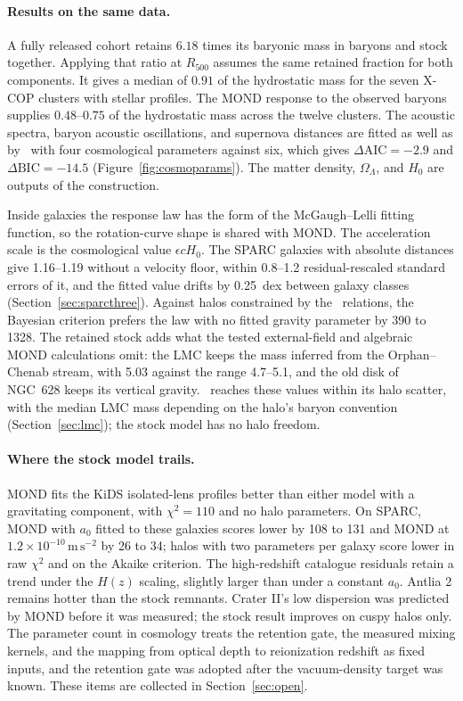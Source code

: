 \paragraph{Results on the same data.}
A fully released cohort retains $6.18$ times its baryonic mass in baryons
and stock together. Applying that ratio at $R_{500}$ assumes the same
retained fraction for both components. It gives a median of $0.91$ of
the hydrostatic mass for the seven X-COP clusters with stellar profiles.
The MOND response to the observed baryons supplies $0.48$--$0.75$ of
the hydrostatic mass across the twelve clusters. The acoustic spectra, baryon acoustic oscillations, and supernova distances are fitted as well
as by \LCDM\ with four cosmological parameters against six, which gives
$\Delta\mathrm{AIC}=-2.9$ and $\Delta\mathrm{BIC}=-14.5$
(Figure~\ref{fig:cosmoparams}). The matter
density, $\Omega_\Lambda$, and $H_0$ are outputs of the construction.

Inside galaxies the response law has the form of the McGaugh--Lelli
fitting function, so the rotation-curve shape is shared with MOND. The
acceleration scale is the cosmological value $\epsilon cH_0$. The SPARC
galaxies with absolute distances give 1.16--1.19 without a velocity floor,
within 0.8--1.2 residual-rescaled standard errors of it, and the fitted
value drifts by 0.25~dex
between galaxy classes (Section~\ref{sec:sparcthree}).
Against halos constrained by the \LCDM\ relations, the Bayesian criterion
prefers the law with no fitted gravity parameter by 390 to 1328. The retained stock adds what
the tested external-field and algebraic MOND calculations omit: the LMC
keeps the mass inferred from the Orphan--Chenab stream, with 5.03 against
the range 4.7--5.1, and the old disk of NGC~628 keeps its vertical gravity.
\LCDM\ reaches these values within its halo scatter, with the median LMC mass depending on the halo's baryon convention
(Section~\ref{sec:lmc}); the stock model has no halo freedom.

\paragraph{Where the stock model trails.}
MOND fits the KiDS isolated-lens profiles better than either model with a
gravitating component, with $\chi^2=110$ and no halo parameters. On SPARC,
MOND with $a_0$ fitted to these galaxies scores lower by 108 to 131 and
MOND at $1.2\times10^{-10}\,\mathrm{m\,s^{-2}}$ by 26 to 34; halos with
two parameters per galaxy score lower in raw $\chi^2$ and on the Akaike
criterion. The high-redshift catalogue residuals retain a trend under the $H(z)$
scaling, slightly larger than under a constant $a_0$. Antlia 2 remains
hotter than the stock remnants. Crater II's low dispersion was predicted
by MOND before it was measured; the stock result improves on cuspy halos
only. The parameter count in cosmology treats the retention gate, the
measured mixing kernels, and the mapping from optical depth to
reionization redshift as fixed inputs, and the retention gate was adopted
after the vacuum-density target was known.
These items are collected in Section~\ref{sec:open}.

